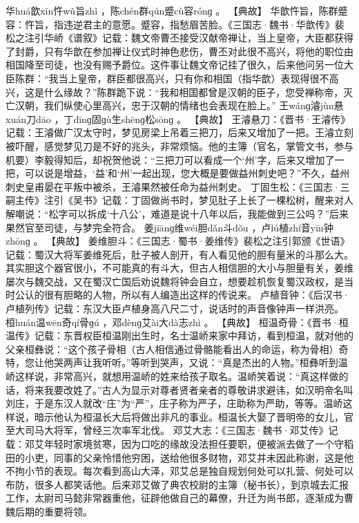 \documentclass[12pt,UTF8]{ctexbook}
\begin{document}
华huá歆xīn忤wǔ旨zhǐ
，陈chén群qún蹙cù容rónɡ
。
【典故】
华歆忤旨，陈群蹙容：忤旨，指违逆君主的意愿。蹙容，指愁眉苦脸。《三国志·魏书·华歆传》裴松之注引华峤《谱叙》记载：魏文帝曹丕接受汉献帝禅让，当上皇帝，大臣都获得了封爵，只有华歆在参加禅让仪式时神色悲伤，曹丕对此很不高兴，将他的职位由相国降至司徒，也没有赐予爵位。这件事让魏文帝记挂了很久，后来他问另一位大臣陈群：“我当上皇帝，群臣都很高兴，只有你和相国（指华歆）表现得很不高兴，这是什么缘故？”陈群跪下说：“我和相国都曾是汉朝的臣子，您受禅称帝，灭亡汉朝，我们纵使心里高兴，忠于汉朝的情绪也会表现在脸上。”
王wánɡ濬jùn悬xuán刀dāo
，丁dīnɡ固ɡù生shēnɡ松sōnɡ
。
【典故】
王濬悬刀：《晋书·王濬传》记载：王濬做广汉太守时，梦见房梁上吊着三把刀，后来又增加了一把。王濬立刻被吓醒，感觉梦见刀是不好的兆头，非常烦恼。他的主簿（官名，掌管文书，参与机要）李毅得知后，却祝贺他说：“三把刀可以看成一个‘州’字，后来又增加了一把，可以说是增益，‘益’和‘州’一起出现，您大概是要做益州刺史吧？”不久，益州刺史皇甫晏在平叛中被杀，王濬果然被任命为益州刺史。
丁固生松：《三国志·三嗣主传》注引《吴书》记载：丁固做尚书时，梦见肚子上长了一棵松树，醒来对人解嘲说：“松字可以拆成‘十八公’，难道是说十八年以后，我能做到三公吗？”后来果然官至司徒，与梦完全符合。
姜jiānɡ维wéi胆dǎn斗dǒu
，卢lú植zhí音yīn钟zhōnɡ
。
【典故】
姜维胆斗：《三国志·蜀书·姜维传》裴松之注引郭颁《世语》记载：蜀汉大将军姜维死后，肚子被人剖开，有人看见他的胆有量米的斗那么大。其实胆这个器官很小，不可能真的有斗大，但古人相信胆的大小与胆量有关，姜维屡次与魏交战，又在蜀汉亡国后劝说魏将钟会自立，想要趁机恢复蜀汉政权，是当时公认的很有胆略的人物，所以有人编造出这样的传说来。
卢植音钟：《后汉书·卢植列传》记载：东汉大臣卢植身高八尺二寸，说话时的声音像钟声一样洪亮。
桓huán温wēn奇qí骨ɡú
，邓dènɡ艾ài大dà志zhì
。
【典故】
桓温奇骨：《晋书·桓温传》记载：东晋权臣桓温刚出生时，名士温峤来家中拜访，看到桓温，就对他的父亲桓彝说：“这个孩子骨相（古人相信通过骨骼能看出人的命运，称为骨相）奇特，您让他哭两声让我听听。”等听到哭声，又说：“真是杰出的人物。”桓彝听到温峤这样说，非常高兴，就想用温峤的姓来给孩子取名。温峤笑着说：“真这样做的话，将来我要改姓了。”古人为显示对尊者贤者亲者的尊敬讲求避讳，如汉明帝名叫刘庄，于是东汉人就改“庄”为“严”，庄子称为严子，庄助称为严助，等等。温峤这样说，暗示他认为桓温长大后将做出非凡的事业。桓温长大娶了晋明帝的女儿，官至大司马大将军，曾经三次率军北伐。
邓艾大志：《三国志·魏书·邓艾传》记载：邓艾年轻时家境贫寒，因为口吃的缘故没法担任要职，便被派去做了一个守稻田的小吏，同事的父亲怜惜他穷困，送给他很多财物，邓艾并未因此称谢，这是他不拘小节的表现。每次看到高山大泽，邓艾总是独自规划何处可以扎营、何处可以布防，很多人都笑话他。后来邓艾做了典农校尉的主簿（秘书长），到京城去汇报工作，太尉司马懿非常器重他，征辟他做自己的幕僚，升迁为尚书郎，逐渐成为曹魏后期的重要将领。
\end{document}
